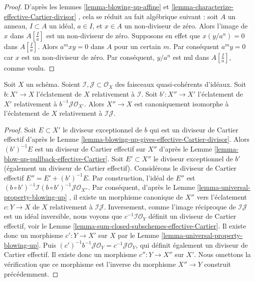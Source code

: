 \begin{proof}
D'après les lemmes  \ref{lemma-blowing-up-affine}  et  \ref{lemma-characterize-effective-Cartier-divisor} , cela se réduit au fait algébrique
suivant : soit  $A$  un anneau,  $I \subset A$  un idéal,  $a \in I$, et
 $x \in A$  un non-diviseur de zéro. Alors l'image de  $x$  dans
 $A[\frac{I}{a}]$  est un non-diviseur de zéro. Supposons en effet que  $x (y/a^n) = 0$ 
dans  $A[\frac{I}{a}]$. Alors  $a^mxy = 0$  dans  $A$  pour un certain
 $m$. Par conséquent  $a^my = 0$  car  $x$  est un non-diviseur de
zéro. Par conséquent,  $y/a^n$  est nul dans  $A[\frac{I}{a}]$, comme voulu.
\end{proof}

\begin{lemma}
\label{lemma-blowing-up-two-ideals}
Soit  $X$  un schéma. Soient  $\mathcal{I}, \mathcal{J} \subset \mathcal{O}_X$  des faisceaux quasi-cohérents
d'idéaux. Soit  $b : X' \to X$  l'éclatement de  $X$  relativement à  $\mathcal{I}$. Soit
 $b' : X'' \to X'$  l'éclatement de  $X'$  relativement à  $b^{-1}\mathcal{J} \mathcal{O}_{X'}$. Alors  $X'' \to X$ 
est canoniquement isomorphe à l'éclatement de  $X$  relativement à  $\mathcal{I}\mathcal{J}$.
\end{lemma}

\begin{proof}
Soit  $E \subset X'$  le diviseur exceptionnel de  $b$  qui est un diviseur de
Cartier effectif d'après le Lemme  \ref{lemma-blowing-up-gives-effective-Cartier-divisor}. Alors  $(b')^{-1}E$  est un diviseur
de Cartier effectif sur  $X''$  d'après le Lemme  \ref{lemma-blow-up-pullback-effective-Cartier}. Soit
 $E' \subset X''$  le diviseur exceptionnel de  $b'$  (également un diviseur de
Cartier effectif). Considérons le diviseur de Cartier effectif  $E'' = E' + (b')^{-1}E$. Par
construction, l'idéal de  $E''$  est  $(b \circ b')^{-1}\mathcal{I} (b \circ b')^{-1}\mathcal{J} \mathcal{O}_{X''}$. Par conséquent, d'après le
Lemme  \ref{lemma-universal-property-blowing-up} , il existe un morphisme canonique de  $X''$  vers
l'éclatement  $c : Y \to X$  de  $X$  relativement à  $\mathcal{I}\mathcal{J}$. Inversement, comme l'image réciproque de
 $\mathcal{I}\mathcal{J}$  est un idéal inversible, nous voyons que  $c^{-1}\mathcal{I}\mathcal{O}_Y$ 
définit un diviseur de Cartier effectif, voir le Lemme  \ref{lemma-sum-closed-subschemes-effective-Cartier}. Il existe donc un
morphisme  $c' : Y \to X'$  sur  $X$  par le Lemme  \ref{lemma-universal-property-blowing-up}. Puis
 $(c')^{-1}b^{-1}\mathcal{J}\mathcal{O}_Y = c^{-1}\mathcal{J}\mathcal{O}_Y$, qui définit également un diviseur de Cartier effectif. Il existe donc un
morphisme  $c'' : Y \to X''$  sur  $X'$. Nous omettons la vérification que ce
morphisme est l'inverse du morphisme  $X'' \to Y$  construit précédemment.
\end{proof}

